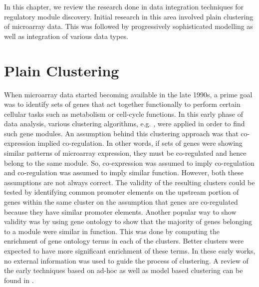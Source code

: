 In this chapter, we review the research done in data integration techniques for regulatory module discovery. Initial research in this area involved plain clustering of microarray data. This was followed by progressively sophisticated modelling as well as integration of various data types.
   
\section{Plain Clustering} 

When microarray data started becoming available in the late 1990s, a prime goal was to identify sets of genes that act together functionally to perform certain cellular tasks such as metabolism or cell-cycle functions. In this early phase of data analysis, various clustering algorithms, e.g. \citet{eisen1998cluster}, were applied in order to find such gene modules.  An assumption behind this clustering approach was that co-expression implied co-regulation. In other words, if sets of genes were showing similar patterns of microarray expression, they must be co-regulated and hence belong to the same module. So, co-expression was assumed to imply co-regulation and co-regulation was assumed to imply similar function. However, both these assumptions are not always correct. The validity of the resulting clusters could be tested by identifying common promoter elements on the upstream portion of genes within the same cluster on the assumption that genes are co-regulated because they have similar promoter elements. Another popular way to show validity was by using gene ontology to show that the majority of genes belonging to a module were similar in function. This was done by computing the enrichment of gene ontology terms in each of the clusters. Better clusters were expected to have more significant enrichment of these terms. In these early works, no external information was used to guide the process of clustering. A review of the early techniques based on ad-hoc as well as model based clustering can be found in \citet{jong02modeling}.

